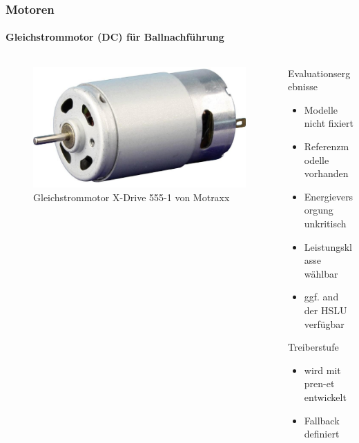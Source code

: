 \begin{frame}
	\frametitle{Motoren \hfill{} \footnotesize \group}
	\framesubtitle{Gleichstrommotor (DC) für Ballnachführung}
	\begin{columns}
		\begin{column}{0.5\textwidth}
			\begin{figure}
				\centering
				\includegraphics[width=1\textwidth]{../../fig/motor/dc_01.png}
				\caption{Gleichstrommotor X-Drive 555-1 von Motraxx}
			\end{figure}
		\end{column}
		\begin{column}{0.5\textwidth}
			\begin{block}{Evaluationsergebnisse}
				\begin{itemize}
					\item Modelle nicht fixiert
					\item Referenzmodelle vorhanden
					\item Energieversorgung unkritisch
					\item Leistungsklasse wählbar
					\item ggf. and der HSLU verfügbar
				\end{itemize}
			\end{block}
			\begin{exampleblock}{Treiberstufe}
				\begin{itemize}
					\item wird mit pren-et entwickelt
					\item Fallback definiert
				\end{itemize}
			\end{exampleblock}
		\end{column}
	\end{columns}
\end{frame}


